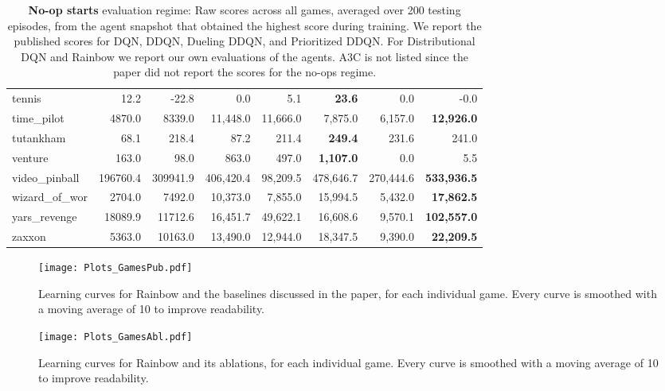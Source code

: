 \documentclass[letterpaper]{article} \usepackage{aaai18}  \usepackage{times}  \usepackage{helvet}  \usepackage{courier}  \usepackage{url}  \usepackage{graphicx}  \usepackage{amsmath,amssymb}
\begin{document}
\begin{table*}[t]
{\begin{tabular}{l|rrrrrrr}
            tennis &      12.2 &     -22.8 &         0.0 &        5.1 &          {\bf  23.6 }&        0.0 &       -0.0 \\
        time\_pilot &    4870.0 &    8339.0 &    11,448.0 &   11,666.0 &        7,875.0 &    6,157.0 & {\bf   12,926.0 }\\
         tutankham &      68.1 &     218.4 &        87.2 &      211.4 &         {\bf  249.4 }&      231.6 &      241.0 \\
           venture &     163.0 &      98.0 &       863.0 &      497.0 &    {\bf    1,107.0} &        0.0 &        5.5 \\
     video\_pinball &  196760.4 &  309941.9 &   406,420.4 &   98,209.5 &      478,646.7 &  270,444.6 &  {\bf 533,936.5}\\
     wizard\_of\_wor &    2704.0 &    7492.0 &    10,373.0 &    7,855.0 &       15,994.5 &    5,432.0 &   {\bf 17,862.5 }\\
      yars\_revenge &   18089.9 &   11712.6 &    16,451.7 &   49,622.1 &       16,608.6 &    9,570.1 &  {\bf 102,557.0 }\\
            zaxxon &    5363.0 &   10163.0 &    13,490.0 &   12,944.0 &       18,347.5 &    9,390.0 &  {\bf  22,209.5 }\\
\bottomrule
\end{tabular}
}
\caption{\textbf{No-op starts} evaluation regime: Raw scores across all games, averaged over 200 testing episodes, from the agent snapshot that obtained the highest score during training. We report the published scores for DQN, DDQN, Dueling DDQN, and Prioritized DDQN. For Distributional DQN and Rainbow we report our own evaluations of the agents. A3C is not listed since the paper did not report the scores for the no-ops regime.}
\label{tab:noop}
\end{table*}


\begin{figure*}
\centering
\texttt{[image: Plots\_GamesPub.pdf]}
\caption{Learning curves for Rainbow and the baselines discussed in the paper, for each individual game. Every curve is smoothed with a moving average of 10 to improve readability.}
\label{fig:published_individual}
\end{figure*}

\begin{figure*}
\centering
\texttt{[image: Plots\_GamesAbl.pdf]}
\caption{Learning curves for Rainbow and its ablations, for each individual game. Every curve is smoothed with a moving average of 10 to improve readability.}
\label{fig:ablations_individual}
\end{figure*}
\end{document}
